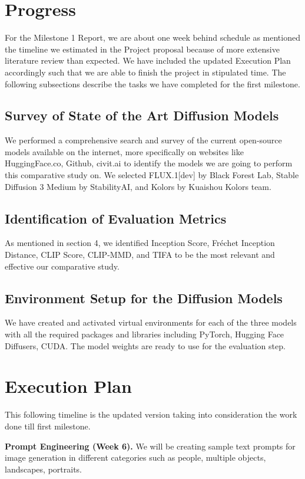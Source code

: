 \documentclass{article}
\begin{document}
\section{Progress}
For the Milestone 1 Report, we are about one week behind schedule as mentioned the timeline we estimated in the Project proposal because of more extensive literature review than expected. We have included the updated Execution Plan accordingly such that we are able to finish the project in stipulated time. The following subsections describe the tasks we have completed for the first milestone.

\subsection{Survey of State of the Art Diffusion Models}
We performed a comprehensive search and survey of the current open-source models available on the internet, more specifically on websites like HuggingFace.co, Github, civit.ai to identify the models we are going to perform this comparative study on. We selected FLUX.1[dev] by Black Forest Lab, Stable Diffusion 3 Medium by StabilityAI, and Kolors by Kuaishou Kolors team.

\subsection{Identification of Evaluation Metrics}
As mentioned in section 4, we identified Inception Score, Fréchet Inception Distance, CLIP Score, CLIP-MMD, and TIFA to be the most relevant and effective our comparative study.

\subsection{Environment Setup for the Diffusion Models}
We have created and activated virtual environments for each of the three models with all the required packages and libraries including PyTorch, Hugging Face Diffusers, CUDA. The model weights are ready to use for the evaluation step.




\section{Execution Plan}
This following timeline is the updated version taking into consideration the work done till first milestone.

\textbf{Prompt Engineering (Week 6).}
We will be creating sample text prompts for image generation in different categories such as people, multiple objects, landscapes, portraits.
\end{document}
